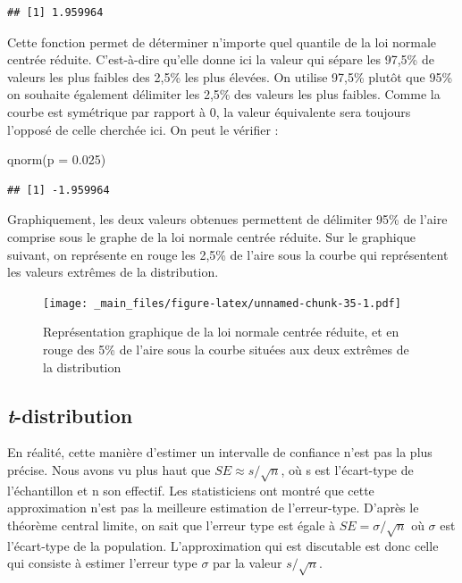 \documentclass[
]{book}
\newenvironment{Shaded}{\begin{snugshade}}{\end{snugshade}}
\newcommand{\AttributeTok}[1]{\textcolor[rgb]{0.77,0.63,0.00}{#1}}
\newcommand{\FloatTok}[1]{\textcolor[rgb]{0.00,0.00,0.81}{#1}}
\newcommand{\FunctionTok}[1]{\textcolor[rgb]{0.00,0.00,0.00}{#1}}
\newcommand{\NormalTok}[1]{#1}
\begin{document}
\begin{verbatim}
## [1] 1.959964
\end{verbatim}

Cette fonction permet de déterminer n'importe quel quantile de la loi normale centrée réduite. C'est-à-dire qu'elle donne ici la valeur qui sépare les 97,5\% de valeurs les plus faibles des 2,5\% les plus élevées. On utilise 97,5\% plutôt que 95\% on souhaite également délimiter les 2,5\% des valeurs les plus faibles. Comme la courbe est symétrique par rapport à 0, la valeur équivalente sera toujours l'opposé de celle cherchée ici. On peut le vérifier :

\begin{Shaded}
\begin{Highlighting}[]
\FunctionTok{qnorm}\NormalTok{(}\AttributeTok{p =} \FloatTok{0.025}\NormalTok{)}
\end{Highlighting}
\end{Shaded}

\begin{verbatim}
## [1] -1.959964
\end{verbatim}

Graphiquement, les deux valeurs obtenues permettent de délimiter 95\% de l'aire comprise sous le graphe de la loi normale centrée réduite. Sur le graphique suivant, on représente en rouge les 2,5\% de l'aire sous la courbe qui représentent les valeurs extrêmes de la distribution.

\begin{figure}
\centering
\texttt{[image: \_main\_files/figure-latex/unnamed-chunk-35-1.pdf]}
\caption{\label{fig:unnamed-chunk-35}Représentation graphique de la loi normale centrée réduite, et en rouge des 5\% de l'aire sous la courbe situées aux deux extrêmes de la distribution}
\end{figure}

\hypertarget{t-distribution}{%
\subsection{\texorpdfstring{\emph{t}-distribution}{t-distribution}}\label{t-distribution}}

En réalité, cette manière d'estimer un intervalle de confiance n'est pas la plus précise. Nous avons vu plus haut que \(SE \approx s/\sqrt{n}\), où s est l'écart-type de l'échantillon et n son effectif. Les statisticiens ont montré que cette approximation n'est pas la meilleure estimation de l'erreur-type. D'après le théorème central limite, on sait que l'erreur type est égale à \(SE = \sigma/\sqrt{n}\) où \(\sigma\) est l'écart-type de la population. L'approximation qui est discutable est donc celle qui consiste à estimer l'erreur type \(\sigma\) par la valeur \(s/\sqrt{n}\).
\end{document}
